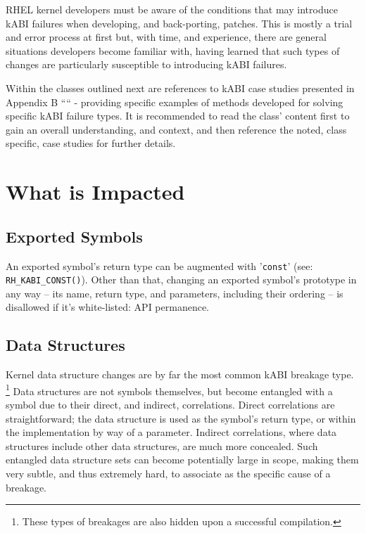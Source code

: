 \documentclass[10pt,oneside,english]{book}
\begin{document}
RHEL kernel developers must be aware of the conditions that may introduce
kABI failures when developing, and back-porting, patches. This is
mostly a trial and error process at first but, with time, and experience,
there are general situations developers become familiar with, having
learned that such types of changes are particularly susceptible to
introducing kABI failures.

Within the classes outlined next are references to kABI case studies
presented in Appendix B ```` -
providing specific examples of methods developed for solving specific
kABI failure types. It is recommended to read the class' content first
to gain an overall understanding, and context, and then reference
the noted, class specific, case studies for further details.

\section{What is Impacted}

\subsection{Exported Symbols}

An exported symbol's return type can be augmented with '\texttt{const}'
(see: \texttt{RH\_KABI\_CONST()}). Other than that, changing an exported
symbol's prototype in any way -- its name, return type, and parameters,
including their ordering -- is disallowed if it's white-listed: API
permanence.

\subsection{Data Structures}

Kernel data structure changes are by far the most common kABI breakage
type. \footnote{These types of breakages are also hidden upon a successful compilation.}
Data structures are not symbols themselves, but become entangled with
a symbol due to their direct, and indirect, correlations. Direct correlations
are straightforward; the data structure is used as the symbol's return
type, or within the implementation by way of a parameter. Indirect
correlations, where data structures include other data structures,
are much more concealed. Such entangled data structure sets can become
potentially large in scope, making them very subtle, and thus extremely
hard, to associate as the specific cause of a breakage.
\end{document}
